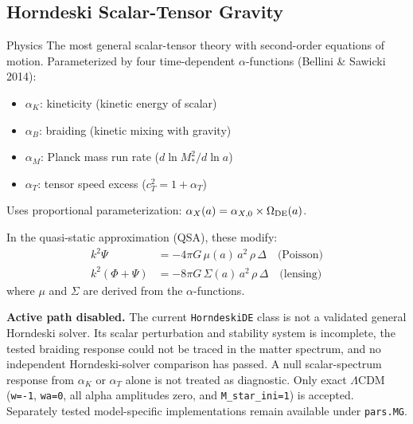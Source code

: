 \documentclass[11pt,a4paper]{article}
\begin{document}
\newpage
\subsection{Horndeski Scalar-Tensor Gravity}

\begin{physbox}{Physics}
The most general scalar-tensor theory with second-order equations of motion. Parameterized by four time-dependent $\alpha$-functions (Bellini \& Sawicki 2014):
\begin{itemize}[nosep]
    \item $\alpha_K$: kineticity (kinetic energy of scalar)
    \item $\alpha_B$: braiding (kinetic mixing with gravity)
    \item $\alpha_M$: Planck mass run rate ($d\ln M_*^2/d\ln a$)
    \item $\alpha_T$: tensor speed excess ($c_T^2 = 1 + \alpha_T$)
\end{itemize}
Uses proportional parameterization: $\alpha_X(a) = \alpha_{X,0} \times \Omega_{\rm DE}(a)$.

In the quasi-static approximation (QSA), these modify:
\begin{align}
    k^2\Psi &= -4\pi G\, \mu(a)\, a^2\, \rho\,\Delta \quad\text{(Poisson)} \\
    k^2(\Phi+\Psi) &= -8\pi G\, \Sigma(a)\, a^2\, \rho\,\Delta \quad\text{(lensing)}
\end{align}
where $\mu$ and $\Sigma$ are derived from the $\alpha$-functions.
\end{physbox}

\begin{notebox}
\textbf{Active path disabled.} The current \texttt{HorndeskiDE} class is not a
validated general Horndeski solver. Its scalar perturbation and stability
system is incomplete, the tested braiding response could not be traced in the
matter spectrum, and no independent Horndeski-solver comparison has passed. A
null scalar-spectrum response from $\alpha_K$ or $\alpha_T$ alone is not treated
as diagnostic. Only exact $\Lambda$CDM (\texttt{w=-1}, \texttt{wa=0}, all alpha
amplitudes zero, and \texttt{M\_star\_ini=1}) is accepted. Separately tested
model-specific implementations remain available under \texttt{pars.MG}.
\end{notebox}
\end{document}
